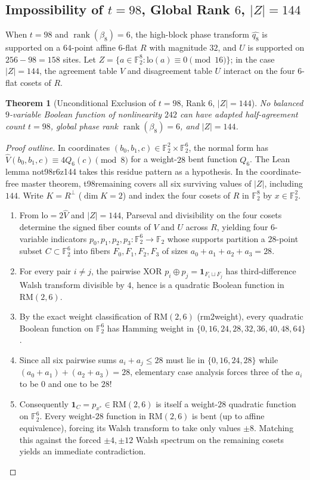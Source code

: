 \documentclass[11pt]{article}
\newtheorem{theorem}{Theorem}[section]
\theoremstyle{definition}
\newcommand{\F}{\mathbb{F}}
\newcommand{\rank}{\operatorname{rank}}
\newcommand{\ind}{\mathbf{1}}
\newcommand{\code}[1]{{\ttfamily\small\renewcommand{\_}{\textunderscore\allowbreak}#1}}
\begin{document}
\subsection{Impossibility of $t = 98$, Global Rank $6$, $|Z| = 144$}

When $t = 98$ and $\rank(\beta_8) = 6$, the high-block phase transform $\widehat{q_8}$ is supported on a $64$-point affine $6$-flat $R$ with magnitude $32$, and $U$ is supported on $256 - 98 = 158$ sites.
Let $Z = \{a \in \F_2^8 : \mathrm{lo}(a) \equiv 0 \pmod{16}\}$; in the case $|Z| = 144$, the agreement table $V$ and disagreement table $U$ interact on the four $6$-flat cosets of $R$.

\begin{theorem}[Unconditional Exclusion of $t = 98$, Rank $6$, $|Z| = 144$]
\label{thm:t98-r6-z144}
No balanced $9$-variable Boolean function of nonlinearity $242$ can have adapted half-agreement count $t = 98$, global phase rank $\rank(\beta_8) = 6$, and $|Z| = 144$.
\end{theorem}
\begin{proof}[Proof outline]
In coordinates $(b_0,b_1,c)\in\F_2^2\times\F_2^6$, the normal form has $\widehat V(b_0,b_1,c)\equiv 4Q_6(c)\pmod 8$ for a weight-$28$ bent function $Q_6$. The Lean lemma \code{no\_t98\_r6\_z144} takes this residue pattern as a hypothesis. In the coordinate-free master theorem, \code{t98\_remaining} covers all six surviving values of $|Z|$, including $144$.
Write $K = R^\perp$ ($\dim K = 2$) and index the four cosets of $R$ in $\F_2^8$ by $x \in \F_2^2$.
\begin{enumerate}[nosep]
  \item From $\mathrm{lo} = 2\widehat{V}$ and $|Z| = 144$, Parseval and divisibility on the four cosets determine the signed fiber counts of $V$ and $U$ across $R$, yielding four $6$-variable indicators $p_0, p_1, p_2, p_3 : \F_2^6 \to \F_2$ whose supports partition a $28$-point subset $C \subset \F_2^6$ into fibers $F_0, F_1, F_2, F_3$ of sizes $a_0 + a_1 + a_2 + a_3 = 28$.
  \item For every pair $i \neq j$, the pairwise XOR $p_i \oplus p_j = \ind_{F_i \sqcup F_j}$ has third-difference Walsh transform divisible by $4$, hence is a quadratic Boolean function in $\mathrm{RM}(2, 6)$.
  \item By the exact weight classification of $\mathrm{RM}(2, 6)$ (\code{rm2\_6\_weight}), every quadratic Boolean function on $\F_2^6$ has Hamming weight in $\{0, 16, 24, 28, 32, 36, 40, 48, 64\}$.
  \item Since all six pairwise sums $a_i + a_j \le 28$ must lie in $\{0, 16, 24, 28\}$ while $(a_0 + a_1) + (a_2 + a_3) = 28$, elementary case analysis forces three of the $a_i$ to be $0$ and one to be $28$!
  \item Consequently $\ind_C = p_{x^*} \in \mathrm{RM}(2, 6)$ is itself a weight-$28$ quadratic function on $\F_2^6$. Every weight-$28$ function in $\mathrm{RM}(2, 6)$ is bent (up to affine equivalence), forcing its Walsh transform to take only values $\pm 8$. Matching this against the forced $\pm 4, \pm 12$ Walsh spectrum on the remaining cosets yields an immediate contradiction. \qedhere
\end{enumerate}
\end{proof}
\end{document}
